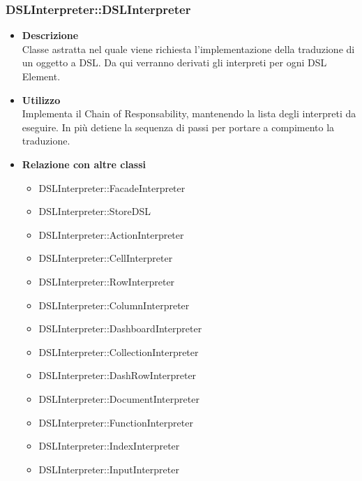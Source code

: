 \subsubsection{DSLInterpreter::DSLInterpreter}
\begin{itemize}
\item \textbf{Descrizione} \hfill \\
  Classe astratta nel quale viene richiesta l'implementazione della traduzione di un oggetto a DSL. Da qui verranno derivati gli interpreti per ogni DSL Element.
\item \textbf{Utilizzo} \hfill \\
  Implementa il Chain of Responsability, mantenendo la lista degli interpreti da eseguire. In più detiene la sequenza di passi per portare a compimento la traduzione.
\item \textbf{Relazione con altre classi} \hfill
  \begin{itemize}
  \item DSLInterpreter::FacadeInterpreter
  \item DSLInterpreter::StoreDSL
  \item DSLInterpreter::ActionInterpreter
  \item DSLInterpreter::CellInterpreter
  \item DSLInterpreter::RowInterpreter
  \item DSLInterpreter::ColumnInterpreter
  \item DSLInterpreter::DashboardInterpreter
  \item DSLInterpreter::CollectionInterpreter
  \item DSLInterpreter::DashRowInterpreter
  \item DSLInterpreter::DocumentInterpreter
  \item DSLInterpreter::FunctionInterpreter
  \item DSLInterpreter::IndexInterpreter
  \item DSLInterpreter::InputInterpreter
  \end{itemize}
\end{itemize}


